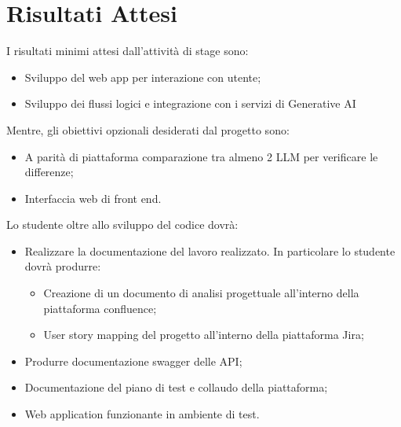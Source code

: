 \section*{Risultati Attesi}
I risultati minimi attesi dall’attività di stage sono:
\begin{itemize}
    \item Sviluppo del web app per interazione con utente;
    \item Sviluppo dei flussi logici e integrazione con i servizi di Generative AI
\end{itemize}

Mentre, gli obiettivi opzionali desiderati dal progetto sono:
\begin{itemize}
    \item A parità di piattaforma comparazione tra almeno 2 LLM per verificare le differenze;
    \item Interfaccia web di front end.
\end{itemize}

Lo studente oltre allo sviluppo del codice dovrà:
\begin{itemize}
    \item Realizzare la documentazione del lavoro realizzato. In particolare lo studente dovrà produrre:
        \begin{itemize}
            \item Creazione di un documento di analisi progettuale all’interno della piattaforma confluence;
            \item User story mapping del progetto all’interno della piattaforma Jira;
        \end{itemize}
    \item Produrre documentazione swagger delle API;
    \item Documentazione del piano di test e collaudo della piattaforma;
    \item Web application funzionante in ambiente di test.
\end{itemize}
    

